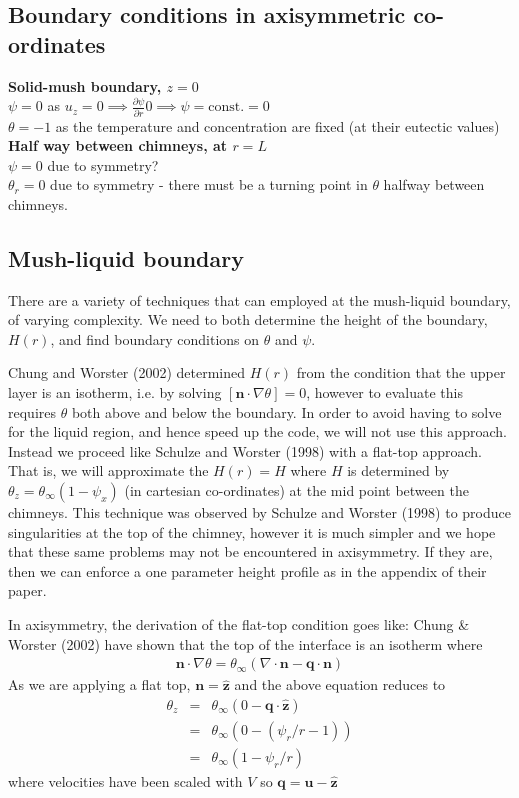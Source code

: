 \documentclass{article}
\begin{document}
\subsection{Boundary conditions in axisymmetric co-ordinates}
\textbf{Solid-mush boundary, $z=0$} \\
$\psi = 0$ as $u_z = 0 \implies \frac{\partial \psi}{\partial r} 0 \implies \psi = \text{const.} = 0$\\
$\theta = -1$ as the temperature and concentration are fixed (at their eutectic values) \\

\textbf{Half way between chimneys, at $r = L$} \\
$\psi = 0$ due to symmetry? \\
$\theta_r = 0$ due to symmetry - there must be a turning point in $\theta$ halfway between chimneys.

\subsection{Mush-liquid boundary}
There are a variety of techniques that can employed at the mush-liquid boundary, of varying complexity. We need to both determine the height of the boundary, $H(r)$, and find boundary conditions on $\theta$ and $\psi$.

Chung and Worster (2002) determined $H(r)$ from the condition that the upper layer is an isotherm, i.e. by solving $[\mathbf{n} \cdot \nabla \theta] = 0$, however to evaluate this requires $\theta$ both above and below the boundary. In order to avoid having to solve for the liquid region, and hence speed up the code, we will not use this approach. Instead we proceed like Schulze and Worster (1998) with a flat-top approach. That is, we will approximate the $H(r) = H$ where $H$ is determined by $\theta_z = \theta_\infty (1-\psi_x)$ (in cartesian co-ordinates) at the mid point between the chimneys. This technique was observed by Schulze and Worster (1998) to produce singularities at the top of the chimney, however it is much simpler and we hope that these same problems may not be encountered in axisymmetry. If they are, then we can enforce a one parameter height profile as in the appendix of their paper.

In axisymmetry, the derivation of the flat-top condition goes like:
Chung \& Worster (2002) have shown that the top of the interface is an isotherm where
\begin{eqnarray}
\mathbf{n} \cdot \nabla \theta = \theta_\infty (\nabla \cdot \mathbf{n} - \mathbf{q} \cdot \mathbf{n})
\end{eqnarray}
As we are applying a flat top, $\mathbf{n} = \mathbf{\hat{z}}$ and the above equation reduces to
\begin{eqnarray}
\theta_{z} &=& \theta_\infty (0 - \mathbf{q} \cdot  \mathbf{\hat{z}}) \\
&=& \theta_\infty (0 - (\psi_r / r - 1)) \\
&=& \theta_\infty (1 - \psi_r / r )
\end{eqnarray}
where velocities have been scaled with $V$ so $\mathbf{q} = \mathbf{u} - \mathbf{\hat{z}}$
\end{document}
